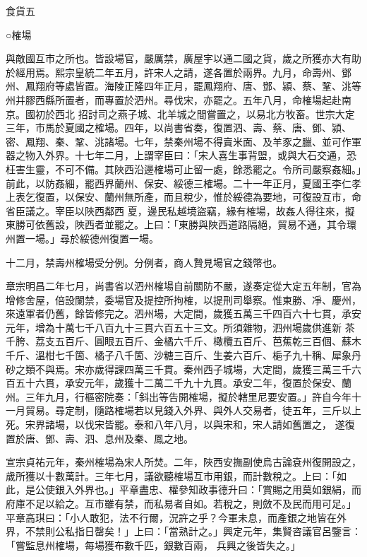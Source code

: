 
\begin{pinyinscope}

 食貨五



 ○榷場



 與敵國互市之所也。皆設場官，嚴厲禁，廣屋宇以通二國之貨，歲之所獲亦大有助於經用焉。熙宗皇統二年五月，許宋人之請，遂各置於兩界。九月，命壽州、鄧州、鳳翔府等處皆置。海陵正隆四年正月，罷鳳翔府、唐、鄧、潁、蔡、鞏、洮等州并膠西縣所置者，而專置於泗州。尋伐宋，亦罷之。五年八月，命榷場起赴南京。國初於西北
 招討司之燕子城、北羊城之間嘗置之，以易北方牧畜。世宗大定三年，市馬於夏國之榷場。四年，以尚書省奏，復置泗、壽、蔡、唐、鄧、潁、密、鳳翔、秦、鞏、洮諸場。七年，禁秦州場不得賣米面、及羊豕之臘、並可作軍器之物入外界。十七年二月，上謂宰臣曰：「宋人喜生事背盟，或與大石交通，恐枉害生靈，不可不備。其陜西沿邊榷場可止留一處，餘悉罷之。令所司嚴察姦細。」前此，以防姦細，罷西界蘭州、保安、綏德三榷場。二十一年正月，夏國王李仁孝上表乞復置，以保安、蘭州無所產，而且稅少，惟於綏德為要地，可復設互市，命省臣議之。宰臣以陜西鄰西
 夏，邊民私越境盜竊，緣有榷場，故姦人得往來，擬東勝可依舊設，陜西者並罷之。上曰：「東勝與陜西道路隔絕，貿易不通，其令環州置一場。」尋於綏德州復置一場。



 十二月，禁壽州榷場受分例。分例者，商人贄見場官之錢幣也。



 章宗明昌二年七月，尚書省以泗州榷場自前關防不嚴，遂奏定從大定五年制，官為增修舍屋，倍設闌禁，委場官及提控所拘榷，以提刑司舉察。惟東勝、凈、慶州，來遠軍者仍舊，餘皆修完之。泗州場，大定間，歲獲五萬三千四百六十七貫，承安元年，增為十萬七千八百九十三貫六百五十三文。所須雜物，泗州場歲供進新
 茶千胯、荔支五百斤、圓眼五百斤、金橘六千斤、橄欖五百斤、芭蕉乾三百個、蘇木千斤、溫柑七千箇、橘子八千箇、沙糖三百斤、生姜六百斤、梔子九十稱、犀象丹砂之類不與焉。宋亦歲得課四萬三千貫。秦州西子城場，大定間，歲獲三萬三千六百五十六貫，承安元年，歲獲十二萬二千九十九貫。承安二年，復置於保安、蘭州。三年九月，行樞密院奏：「斜出等告開榷場，擬於轄里尼要安置。」許自今年十一月貿易。尋定制，隨路榷場若以見錢入外界、與外人交易者，徒五年，三斤以上死。宋界諸場，以伐宋皆罷。泰和八年八月，以與宋和，宋人請如舊置之，
 遂復置於唐、鄧、壽、泗、息州及秦、鳳之地。



 宣宗貞祐元年，秦州榷場為宋人所焚。二年，陜西安撫副使烏古論袞州復開設之，歲所獲以十數萬計。三年七月，議欲聽榷場互市用銀，而計數稅之。上曰：「如此，是公使銀入外界也。」平章盡忠、權參知政事德升曰：「賞賜之用莫如銀絹，而府庫不足以給之。互市雖有禁，而私易者自如。若稅之，則斂不及民而用可足。」平章高琪曰：「小人敢犯，法不行爾，況許之乎？今軍未息，而產銀之地皆在外界，不禁則公私指日罄矣！」上曰：「當熟計之。」興定元年，集賢咨議官呂鑒言：「嘗監息州榷場，每場獲布數千匹，銀數百兩，
 兵興之後皆失之。」




\end{pinyinscope}
